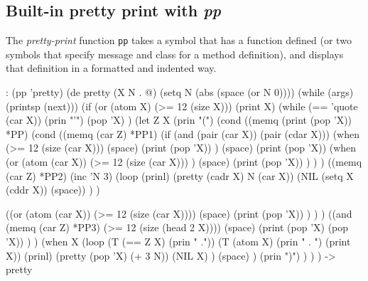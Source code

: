  
\subsection{Built-in pretty print with \emph{pp}}
\label{sec:tut-built-in-pretty-print-with-pp}


The \emph{pretty-print} function \texttt{pp} takes a symbol that has a function
defined (or two symbols that specify message and class for a method
definition), and displays that definition in a formatted and indented
way.


\begin{wideverbatim}
: (pp 'pretty)
(de pretty (X N . @)
   (setq N (abs (space (or N 0))))
   (while (args) (printsp (next)))
   (if (or (atom X) (>= 12 (size X)))
      (print X)
      (while (== 'quote (car X))
         (prin "'")
         (pop 'X) )
      (let Z X
         (prin "(")
         (cond
            ((memq (print (pop 'X)) *PP)
               (cond
                  ((memq (car Z) *PP1)
                     (if (and (pair (car X)) (pair (cdar X)))
                        (when (>= 12 (size (car X)))
                           (space)
                           (print (pop 'X)) )
                        (space)
                        (print (pop 'X))
                        (when
                           (or
                              (atom (car X))
                              (>= 12 (size (car X))) )
                           (space)
                           (print (pop 'X)) ) ) )
                  ((memq (car Z) *PP2)
                     (inc 'N 3)
                     (loop
                        (prinl)
                        (pretty (cadr X) N (car X))
                        (NIL (setq X (cddr X)) (space)) ) )

\end{wideverbatim}

\begin{wideverbatim}


                  ((or (atom (car X)) (>= 12 (size (car X))))
                     (space)
                     (print (pop 'X)) ) ) )
            ((and (memq (car Z) *PP3) (>= 12 (size (head 2 X))))
               (space)
               (print (pop 'X) (pop 'X)) ) )
         (when X
            (loop
               (T (== Z X) (prin " ."))
               (T (atom X) (prin " . ") (print X))
               (prinl)
               (pretty (pop 'X) (+ 3 N))
               (NIL X) )
            (space) )
         (prin ")") ) ) )
-> pretty
\end{wideverbatim}

